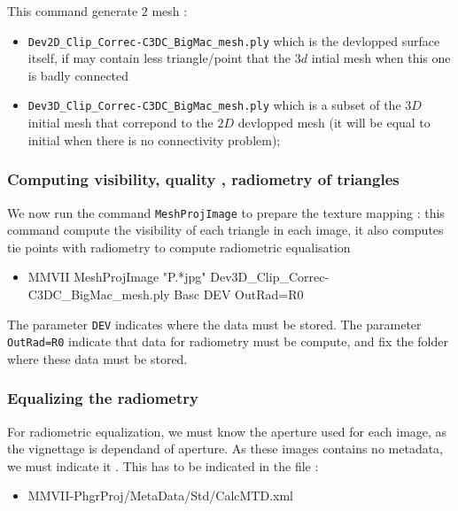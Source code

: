 This command generate $2$ mesh :

\begin{itemize}
	\item {\tt Dev2D\_Clip\_Correc-C3DC\_BigMac\_mesh.ply} which is the devlopped surface itself,
              if may contain less triangle/point that the $3d$ intial mesh when this one is badly connected 
		
	\item {\tt Dev3D\_Clip\_Correc-C3DC\_BigMac\_mesh.ply} which is a subset of the $3D$ initial mesh
		that correpond to the $2D$ devlopped mesh (it will be equal to initial when there is no connectivity problem);
\end{itemize}


\subsubsection{Computing visibility, quality , radiometry of triangles}

We now run the command  {\tt MeshProjImage} to prepare the texture mapping : this command
compute the visibility of each triangle in each image, it also computes tie points with 
radiometry to compute radiometric equalisation 

\begin{itemize}
    \item {MMVII MeshProjImage "P.*jpg"  Dev3D\_Clip\_Correc-C3DC\_BigMac\_mesh.ply Basc DEV OutRad=R0}
\end{itemize}

The parameter {\tt DEV} indicates where the data must be stored.
The parameter {\tt OutRad=R0} indicate that data for radiometry 
must be compute, and fix the folder where these data must be stored.


\subsubsection{Equalizing the radiometry}

For radiometric equalization, we must know the aperture used for each image,
as the vignettage is dependand of aperture. As these images contains no metadata,
we must indicate it . This has to be indicated in the file :

\begin{itemize}
    \item {MMVII-PhgrProj/MetaData/Std/CalcMTD.xml}
\end{itemize}

